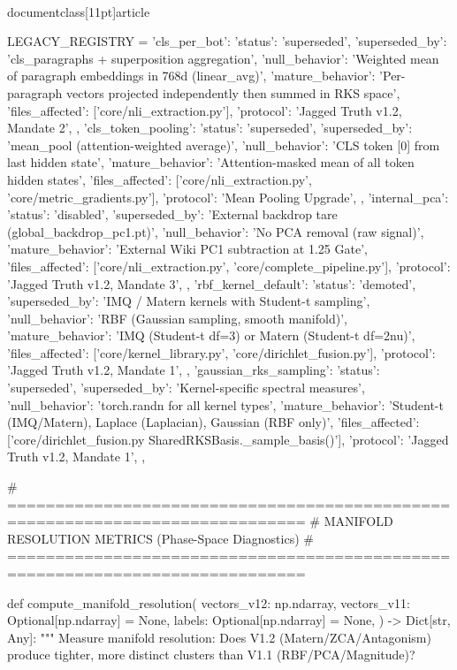 \\documentclass[11pt]{article}
\begin{document}
\begin{CodeBlock}
LEGACY_REGISTRY = {
    'cls_per_bot': {
        'status': 'superseded',
        'superseded_by': 'cls_paragraphs + superposition aggregation',
        'null_behavior': 'Weighted mean of paragraph embeddings in 768d (linear_avg)',
        'mature_behavior': 'Per-paragraph vectors projected independently then summed in RKS space',
        'files_affected': ['core/nli_extraction.py'],
        'protocol': 'Jagged Truth v1.2, Mandate 2',
    },
    'cls_token_pooling': {
        'status': 'superseded',
        'superseded_by': 'mean_pool (attention-weighted average)',
        'null_behavior': 'CLS token [0] from last hidden state',
        'mature_behavior': 'Attention-masked mean of all token hidden states',
        'files_affected': ['core/nli_extraction.py', 'core/metric_gradients.py'],
        'protocol': 'Mean Pooling Upgrade',
    },
    'internal_pca': {
        'status': 'disabled',
        'superseded_by': 'External backdrop tare (global_backdrop_pc1.pt)',
        'null_behavior': 'No PCA removal (raw signal)',
        'mature_behavior': 'External Wiki PC1 subtraction at 1.25 Gate',
        'files_affected': ['core/nli_extraction.py', 'core/complete_pipeline.py'],
        'protocol': 'Jagged Truth v1.2, Mandate 3',
    },
    'rbf_kernel_default': {
        'status': 'demoted',
        'superseded_by': 'IMQ / Matern kernels with Student-t sampling',
        'null_behavior': 'RBF (Gaussian sampling, smooth manifold)',
        'mature_behavior': 'IMQ (Student-t df=3) or Matern (Student-t df=2nu)',
        'files_affected': ['core/kernel_library.py', 'core/dirichlet_fusion.py'],
        'protocol': 'Jagged Truth v1.2, Mandate 1',
    },
    'gaussian_rks_sampling': {
        'status': 'superseded',
        'superseded_by': 'Kernel-specific spectral measures',
        'null_behavior': 'torch.randn for all kernel types',
        'mature_behavior': 'Student-t (IMQ/Matern), Laplace (Laplacian), Gaussian (RBF only)',
        'files_affected': ['core/dirichlet_fusion.py SharedRKSBasis._sample_basis()'],
        'protocol': 'Jagged Truth v1.2, Mandate 1',
    },
}


# =============================================================================
# MANIFOLD RESOLUTION METRICS (Phase-Space Diagnostics)
# =============================================================================

def compute_manifold_resolution(
    vectors_v12: np.ndarray,
    vectors_v11: Optional[np.ndarray] = None,
    labels: Optional[np.ndarray] = None,
) -> Dict[str, Any]:
    """
    Measure manifold resolution: Does V1.2 (Matern/ZCA/Antagonism) produce
    tighter, more distinct clusters than V1.1 (RBF/PCA/Magnitude)?


\end{CodeBlock}
\end{document}
